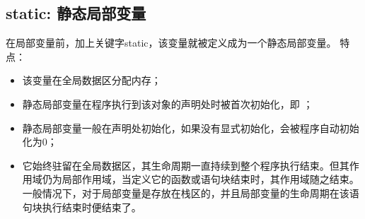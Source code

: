 \documentclass[letterpaper,10pt,english]{sphinxmanual}
\begin{document}
\subsection{static: 静态局部变量}
\label{\detokenize{cpp/14_staticExtern:id2}}
在局部变量前，加上关键字static，该变量就被定义成为一个静态局部变量。
特点：
\begin{itemize}
\item {} 
该变量在全局数据区分配内存；

\item {} 
静态局部变量在程序执行到该对象的声明处时被首次初始化，即  ；

\item {} 
静态局部变量一般在声明处初始化，如果没有显式初始化，会被程序自动初始化为0；

\item {} 
它始终驻留在全局数据区，其生命周期一直持续到整个程序执行结束。但其作用域仍为局部作用域，当定义它的函数或语句块结束时，其作用域随之结束。一般情况下，对于局部变量是存放在栈区的，并且局部变量的生命周期在该语句块执行结束时便结束了。

\end{itemize}

%
\begin{sphinxVerbatim}[commandchars=\\\{\},numbers=left,firstnumber=1,stepnumber=1]
 
       
      
   

 
   
   
   
\end{sphinxVerbatim}
\end{document}
